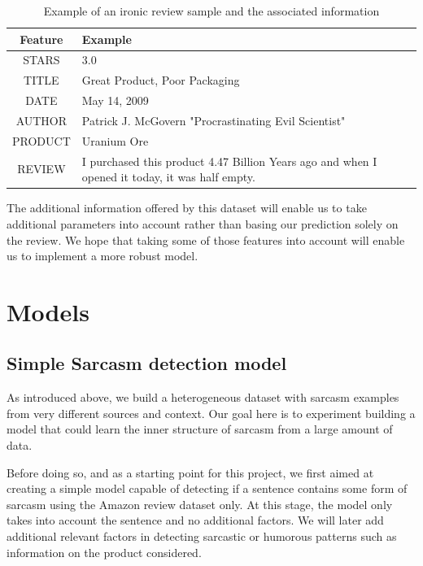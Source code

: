 \documentclass[10pt,twocolumn,letterpaper]{article}
\begin{document}
\begin{table}[H]
\centering
\small
\begin{tabular}{|c|p{6cm}|}
\hline
\textbf{Feature} & \textbf{Example} \\
\hline
STARS & 3.0 \\
TITLE & Great Product, Poor Packaging \\
DATE & May 14, 2009 \\
AUTHOR & Patrick J. McGovern "Procrastinating Evil Scientist"\\
PRODUCT & Uranium Ore \\
REVIEW & I purchased this product 4.47 Billion Years ago and when I opened it today, it was half empty. \\
\hline

\end{tabular}
\caption{Example of an ironic review sample and the associated information}
\label{tab:mytable}
\end{table}

The additional information offered by this dataset will enable us to take additional parameters into account rather than basing our prediction solely on the review.
We hope that taking some of those features into account will enable us to implement a more robust model.






\section{Models}
\subsection{Simple Sarcasm detection model}
As introduced above, we build a heterogeneous dataset with sarcasm examples from very different sources and context.
Our goal here is to experiment building a model that could learn the inner structure of sarcasm from a large amount of data.

Before doing so, and as a starting point for this project, we first aimed at creating a simple model capable of detecting if a sentence contains some form of sarcasm using the Amazon review dataset only.
At this stage, the model only takes into account the sentence and no additional factors. We will later add additional relevant factors in detecting sarcastic or humorous patterns such as information on the product considered.
\end{document}

